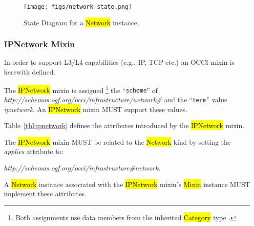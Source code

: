 \documentclass[10pt,a4paper]{article}
\begin{document}
\begin{figure}[!h]
	\centering
	\texttt{[image: figs/network-state.png]}
	\caption{State Diagram for a \hl{Network} instance.}
	\label{fig:network_state}
\end{figure}

\subsubsection{IPNetwork Mixin}

In order to support L3/L4 capabilities (e.g., IP, TCP etc.) an OCCI
mixin is herewith defined.

The \hl{IPNetwork} mixin is assigned%
\footnote{Both assignments use data members from the inherited
  \hl{Category} type \cite{occi:core}.}  the ``{\tt scheme}'' of
\textit{http://schemas.ogf.org/occi/infrastructure/network\#} and the
``{\tt term}'' value \textit{ipnetwork}. An \hl{IPNetwork} mixin
MUST support these values.

Table~\ref{tbl:ipnetwork} defines the attributes introduced by the
\hl{IPNetwork} mixin.

The \hl{IPNetwork} mixin MUST be related to the \hl{Network} kind
by setting the \textit{applies} attribute to:

\textit{http://schemas.ogf.org/occi/infrastructure\#network}.

A \hl{Network} instance associated with the
\hl{IPNetwork} mixin's \hl{Mixin} instance MUST implement these
attributes.

\end{document}
